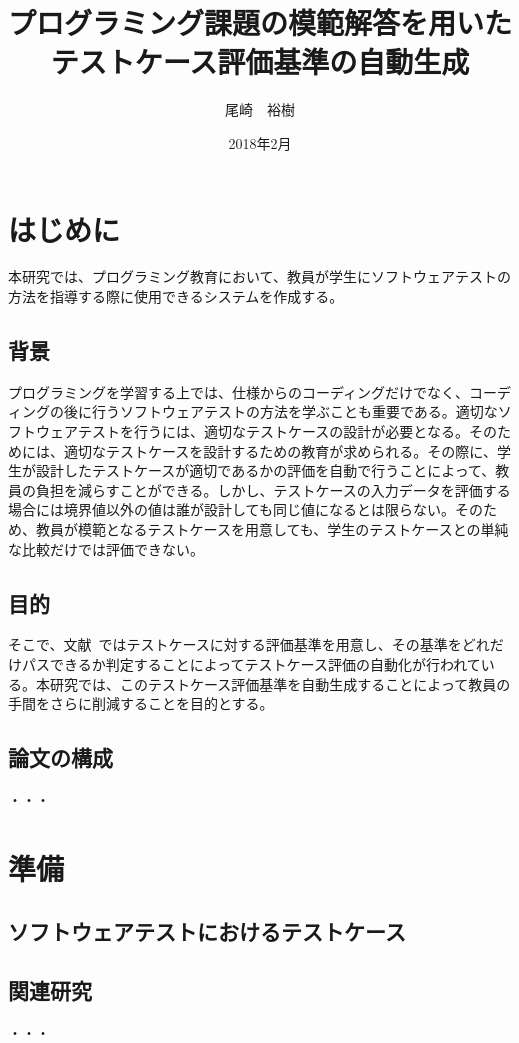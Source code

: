 \documentclass{tpu-sotu}
\author{尾崎　裕樹}
\title{プログラミング課題の模範解答を用いた\\テストケース評価基準の自動生成}
\date{2018年2月}
\begin{document}
%
\maketitle
\clearpage
{}
\tableofcontents
\clearpage
{}
%

%
\chapter{はじめに}
本研究では、プログラミング教育において、教員が学生にソフトウェアテストの方法を指導する際に使用できるシステムを作成する。
\section{背景}
プログラミングを学習する上では、仕様からのコーディングだけでなく、コーディングの後に行うソフトウェアテストの方法を学ぶことも重要である。適切なソフトウェアテストを行うには、適切なテストケースの設計が必要となる。そのためには、適切なテストケースを設計するための教育が求められる。その際に、学生が設計したテストケースが適切であるかの評価を自動で行うことによって、教員の負担を減らすことができる。しかし、テストケースの入力データを評価する場合には境界値以外の値は誰が設計しても同じ値になるとは限らない。そのため、教員が模範となるテストケースを用意しても、学生のテストケースとの単純な比較だけでは評価できない。
\section{目的}
そこで、文献~\cite{a1}ではテストケースに対する評価基準を用意し、その基準をどれだけパスできるか判定することによってテストケース評価の自動化が行われている。本研究では、このテストケース評価基準を自動生成することによって教員の手間をさらに削減することを目的とする。
\section{論文の構成}
  ・・・
\chapter{準備}
\section{ソフトウェアテストにおけるテストケース}
\section{関連研究}
  ・・・
\end{document}

